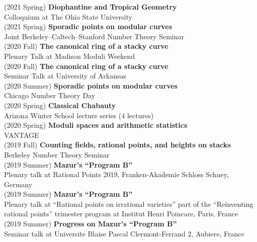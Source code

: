 \documentclass[margin,line]{res}
\begin{document}
\begin{resume}
(2021 Spring) \textbf{Diophantine and Tropical Geometry}\\
Colloquium at The Ohio State University 
\vspace{.05cm}\\
(2021 Spring) \textbf{Sporadic points on modular curves}\\
Joint Berkeley--Caltech--Stanford Number Theory Seminar
\vspace{.05cm}\\
(2020 Fall) \textbf{The canonical ring of a stacky curve}\\  
Plenary Talk at Madison Moduli Weekend 
\vspace{.05cm}\\
(2020 Fall) \textbf{The canonical ring of a stacky curve}\\  
Seminar Talk at University of Arkansas
\vspace{.05cm}\\
(2020 Summer) \textbf{Sporadic points on modular curves}\\
Chicago Number Theory Day 
\vspace{.05cm}\\
(2020 Spring) \textbf{Classical Chabauty}\\
Arizona Winter School lecture series (4 lectures)
\vspace{.05cm}\\
(2020 Spring) \textbf{Moduli spaces and arithmetic statistics}\\
VANTAGE
\vspace{.05cm}\\
(2019 Fall) \textbf{Counting fields, rational points, and heights on stacks}\\
Berkeley Number Theory Seminar
\vspace{.05cm}\\
(2019 Summer) \textbf{Mazur's ``Program B''}\\  
Plenary talk at Rational Points 2019, Franken-Akademie Schloss Schney, Germany
\vspace{.05cm}\\
(2019 Summer) \textbf{Mazur's ``Program B''}\\  
Plenary talk at ``Rational points on irrational varieties'' part of the  ``Reinventing rational points'' trimester program at Institut Henri Poincare, Paris, France
\\
(2019 Summer) \textbf{Progress on Mazur's ``Program B''}\\  
Seminar talk at Universite Blaise Pascal Clermont-Ferrand 2, Aubiere, France

\end{resume}
\end{document}
